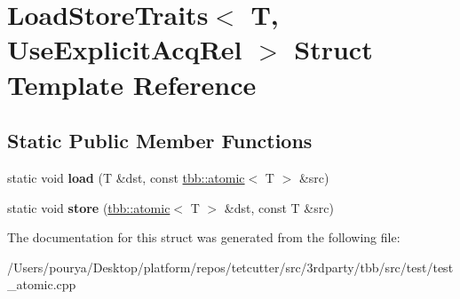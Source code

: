 \hypertarget{structLoadStoreTraits_3_01T_00_01UseExplicitAcqRel_01_4}{}\section{Load\+Store\+Traits$<$ T, Use\+Explicit\+Acq\+Rel $>$ Struct Template Reference}
\label{structLoadStoreTraits_3_01T_00_01UseExplicitAcqRel_01_4}
\subsection*{Static Public Member Functions}
\begin{DoxyCompactItemize}
\item 
\hypertarget{structLoadStoreTraits_3_01T_00_01UseExplicitAcqRel_01_4_abe607a690a94fa7cc3b8a284ee69a8c2}{}static void {\bfseries load} (T \&dst, const \hyperlink{structtbb_1_1atomic}{tbb\+::atomic}$<$ T $>$ \&src)\label{structLoadStoreTraits_3_01T_00_01UseExplicitAcqRel_01_4_abe607a690a94fa7cc3b8a284ee69a8c2}

\item 
\hypertarget{structLoadStoreTraits_3_01T_00_01UseExplicitAcqRel_01_4_aa03315810dd7ee73db53abab07adf9c8}{}static void {\bfseries store} (\hyperlink{structtbb_1_1atomic}{tbb\+::atomic}$<$ T $>$ \&dst, const T \&src)\label{structLoadStoreTraits_3_01T_00_01UseExplicitAcqRel_01_4_aa03315810dd7ee73db53abab07adf9c8}

\end{DoxyCompactItemize}


The documentation for this struct was generated from the following file\+:\begin{DoxyCompactItemize}
\item 
/\+Users/pourya/\+Desktop/platform/repos/tetcutter/src/3rdparty/tbb/src/test/test\+\_\+atomic.\+cpp\end{DoxyCompactItemize}
